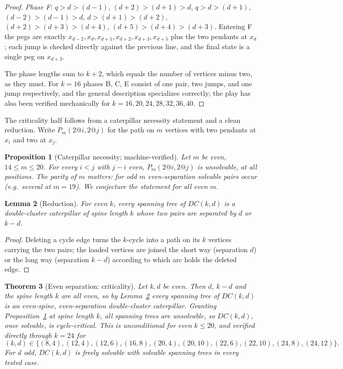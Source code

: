 \documentclass[11pt]{article}
\newtheorem{theorem}{Theorem}[section]
\newtheorem{lemma}[theorem]{Lemma}
\newtheorem{proposition}[theorem]{Proposition}
\theoremstyle{definition}
\begin{document}
\begin{proof}
\emph{Phase F}: $q{>}d{>}(d{-}1)$, $(d{+}2){>}(d{+}1){>}d$,
$q{>}d{>}(d{+}1)$, $(d{-}2){>}(d{-}1){>}d$, $d{>}(d{+}1){>}(d{+}2)$,
$(d{+}2){>}(d{+}3){>}(d{+}4)$, $(d{+}5){>}(d{+}4){>}(d{+}3)$.
Entering F the pegs are exactly
$x_{d-2},x_d,x_{d+1},x_{d+2},x_{d+3},x_{d+5}$ plus the two pendants
at $x_d$; each jump is checked directly against the previous line,
and the final state is a single peg on $x_{d+3}$.

The phase lengths sum to $k+2$, which equals the number of vertices
minus two, as they must. For $k=16$ phases B, C, E consist of one
pair, two jumps, and one jump respectively, and the general
description specializes correctly; the play has also been verified
mechanically for $k=16,20,24,28,32,36,40$.
\end{proof}

The criticality half follows from a caterpillar necessity statement
and a clean reduction. Write $P_m(2\!@\!i,2\!@\!j)$ for the path on
$m$ vertices with two pendants at $x_i$ and two at $x_j$.

\begin{proposition}[Caterpillar necessity; machine-verified]
\label{prop:catnec}
Let $m$ be even, $14\le m\le 20$. For every $i<j$ with $j-i$ even,
$P_m(2\!@\!i,2\!@\!j)$ is unsolvable, at all positions. The parity
of $m$ matters: for odd $m$ even-separation solvable pairs occur
(e.g.\ several at $m=19$). We conjecture the statement for all even
$m$.
\end{proposition}

\begin{lemma}[Reduction]\label{lem:dcreduce}
For even $k$, every spanning tree of $DC(k,d)$ is a double-cluster
caterpillar of spine length $k$ whose two pairs are separated by
$d$ or $k-d$.
\end{lemma}

\begin{proof}
Deleting a cycle edge turns the $k$-cycle into a path on its $k$
vertices carrying the two pairs; the loaded vertices are joined the
short way (separation $d$) or the long way (separation $k-d$)
according to which arc holds the deleted edge.
\end{proof}

\begin{theorem}[Even separation: criticality]\label{thm:evencrit}
Let $k,d$ be even. Then $d$, $k-d$ and the spine length $k$ are all
even, so by Lemma~\ref{lem:dcreduce} every spanning tree of
$DC(k,d)$ is an even-spine, even-separation double-cluster
caterpillar. Granting Proposition~\ref{prop:catnec} at spine length
$k$, all spanning trees are unsolvable, so $DC(k,d)$, once solvable,
is cycle-critical. This is unconditional for even $k\le 20$, and
verified directly through $k=24$ for
\[
(k,d)\in\{(8,4),(12,4),(12,6),(16,8),(20,4),(20,10),(22,6),(22,10),
(24,8),(24,12)\}.
\]
For $d$ odd, $DC(k,d)$ is freely solvable with solvable spanning trees
in every tested case.
\end{theorem}
\end{document}
